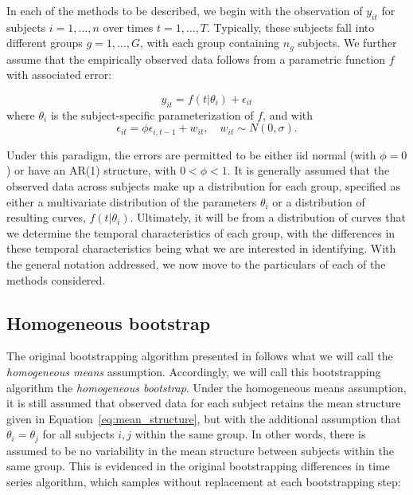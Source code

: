 \documentclass{article}
\begin{document}
In each of the methods to be described, we begin with the observation of $y_{it}$ for subjects $i = 1, \dots, n$ over times $t = 1, \dots, T$. Typically, these subjects fall into different groups $g = 1, \dots, G$, with each group containing $n_g$ subjects. We further assume that the empirically observed data follows from a parametric function $f$ with associated error:

\begin{equation}\label{eq:mean_structure}
y_{it} = f(t|\theta_i) + \epsilon_{it}
\end{equation}
where $\theta_i$ is the subject-specific parameterization of $f$, and with
\begin{equation}
\epsilon_{it} = \phi \epsilon_{i, t-1} + w_{it}, \quad w_{it} \sim N(0, \sigma).
\end{equation}

Under this paradigm, the errors are permitted to be either iid normal (with $\phi = 0$) or have an AR(1) structure, with $0 < \phi < 1$. It is generally assumed that the observed data across subjects make up a distribution for each group, specified as either a multivariate distribution of the parameters $\theta_i$ or a distribution of resulting curves, $f(t|\theta_i)$. Ultimately, it will be from a distribution of curves that we determine the temporal characteristics of each group, with the differences in these temporal characteristics being what we are interested in identifying. With the general notation addressed, we now move to the particulars of each of the methods considered.

\subsection{Homogeneous bootstrap}

The original bootstrapping algorithm presented in \citet{oleson2017detecting} follows what we will call the \textit{homogeneous means} assumption. Accordingly, we will call this bootstrapping algorithm the \textit{homogeneous bootstrap}. Under the homogeneous means assumption, it is still assumed that observed data for each subject retains the mean structure given in Equation~\ref{eq:mean_structure}, but with the additional assumption that $\theta_i = \theta_j$ for all subjects $i, j$ within the same group. In other words, there is assumed to be no variability in the mean structure between subjects within the same group. This is evidenced in the original bootstrapping differences in time series algorithm, which samples without replacement at each bootstrapping step:
\end{document}
